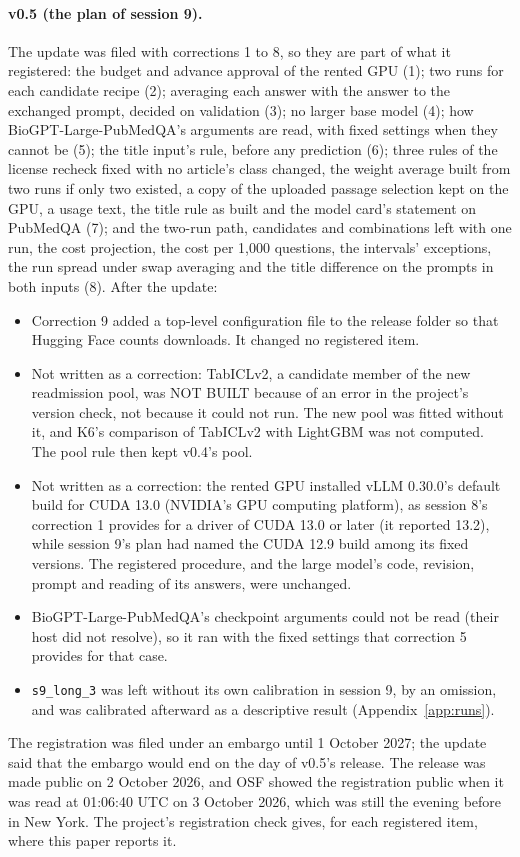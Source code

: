 \documentclass[11pt,letterpaper]{article}
\newcommand{\sysname}[1]{\texttt{#1}}
\newcommand{\idn}[1]{#1}%
\begin{document}
\paragraph{v0.5 (the plan of session \idn{9}).} The update was filed with corrections \idn{1} to \idn{8}, so they are part of what it registered: the budget and advance approval of the rented GPU (\idn{1}); two runs for each candidate recipe (\idn{2}); averaging each answer with the answer to the exchanged prompt, decided on validation (\idn{3}); no larger base model (\idn{4}); how BioGPT-Large-PubMedQA's arguments are read, with fixed settings when they cannot be (\idn{5}); the title input's rule, before any prediction (\idn{6}); three rules of the license recheck fixed with no article's class changed, the weight average built from two runs if only two existed, a copy of the uploaded passage selection kept on the GPU, a usage text, the title rule as built and the model card's statement on PubMedQA (\idn{7}); and the two-run path, candidates and combinations left with one run, the cost projection, the cost per 1,000 questions, the intervals' exceptions, the run spread under swap averaging and the title difference on the prompts in both inputs (\idn{8}). After the update:
\begin{itemize}\setlength{\itemsep}{1pt}
\item Correction \idn{9} added a top-level configuration file to the release folder so that Hugging Face counts downloads. It changed no registered item.
\item Not written as a correction: TabICLv2, a candidate member of the new readmission pool, was NOT BUILT because of an error in the project's version check, not because it could not run. The new pool was fitted without it, and K6's comparison of TabICLv2 with LightGBM was not computed. The pool rule then kept v0.4's pool.
\item Not written as a correction: the rented GPU installed vLLM \idn{0.30.0}'s default build for CUDA \idn{13.0} (NVIDIA's GPU computing platform), as session \idn{8}'s correction \idn{1} provides for a driver of CUDA \idn{13.0} or later (it reported \idn{13.2}), while session \idn{9}'s plan had named the CUDA \idn{12.9} build among its fixed versions. The registered procedure, and the large model's code, revision, prompt and reading of its answers, were unchanged.
\item BioGPT-Large-PubMedQA's checkpoint arguments could not be read (their host did not resolve), so it ran with the fixed settings that correction \idn{5} provides for that case.
\item \sysname{s9\_long\_3} was left without its own calibration in session \idn{9}, by an omission, and was calibrated afterward as a descriptive result (Appendix~\ref{app:runs}).
\end{itemize}
The registration was filed under an embargo until 1 October 2027; the update said that the embargo would end on the day of v0.5's release. The release was made public on 2 October 2026, and OSF showed the registration public when it was read at 01:06:40 UTC on 3 October 2026, which was still the evening before in New York. The project's registration check gives, for each registered item, where this paper reports it.
\end{document}
